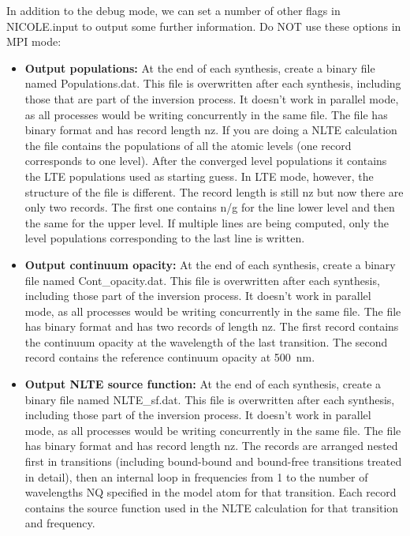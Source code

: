 In addition to the debug mode, we can set a number of other flags in
NICOLE.input to output some further information. Do NOT use these options
in MPI mode:
\begin{itemize}
\item {\bf Output populations:} At the end of each synthesis, create a
  binary file named Populations.dat. This file is overwritten after
  each synthesis, including those that are part of the inversion
  process. It doesn't work in parallel mode, as all processes would be
  writing concurrently in the same file. The file has binary format
  and has record length nz. If you are doing a NLTE calculation the
  file contains the populations of all the atomic levels (one record
  corresponds to one level). After the converged level populations it
  contains the LTE populations used as starting guess. In LTE mode,
  however, the structure of the file is different. The record length
  is still nz but now there are only two records. The first one
  contains n/g for the line lower level and then the same for the
  upper level. If multiple lines are being computed, only the level
  populations corresponding to the last line is written.
\item {\bf Output continuum opacity:} At the end of each synthesis,
  create a binary file named Cont\_opacity.dat. This file is
  overwritten after each synthesis, including those part of the
  inversion process. It doesn't work in parallel mode, as all
  processes would be writing concurrently in the same file. The file
  has binary format and has two records of length nz. The first record
  contains the continuum opacity at the wavelength of the last
  transition. The second record contains the reference continuum
  opacity at 500~nm.
\item {\bf Output NLTE source function:} At the end of each synthesis,
  create a binary file named NLTE\_sf.dat. This file is overwritten
  after each synthesis, including those part of the inversion
  process. It doesn't work in parallel mode, as all processes would be
  writing concurrently in the same file. The file has binary format
  and has record length nz. The records are arranged nested first in
  transitions (including bound-bound and bound-free transitions
  treated in detail), then an internal loop in frequencies from 1 to
  the number of wavelengths NQ specified in the model atom for that
  transition. Each record contains the source function used in the
  NLTE calculation for that transition and frequency.
\end{itemize}

